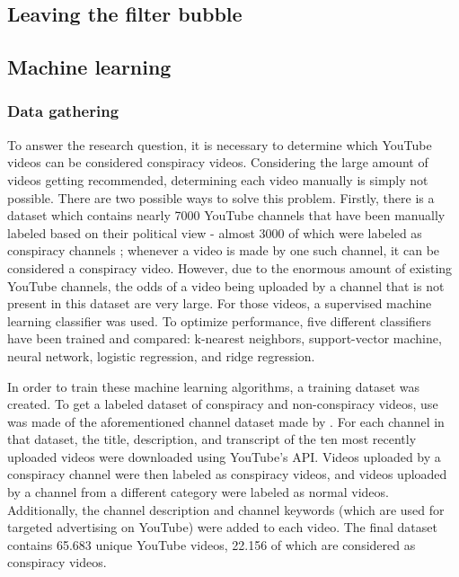 \documentclass[../main.tex]{subfiles}
\begin{document}
\linenumbers

\subsection{Leaving the filter bubble}

\subsection{Machine learning}
\subsubsection{Data gathering}
To answer the research question, it is necessary to determine which YouTube videos can be considered
conspiracy videos. Considering the large amount of videos getting recommended, determining each video
manually is simply not possible. There are two possible ways to solve this problem. Firstly, there is a
dataset which contains nearly 7000 YouTube channels that have been manually labeled based on their
political view - almost 3000 of which were labeled as conspiracy channels \citep{ledwich2019algorithmic};
whenever a video is made by one such channel, it can be considered a conspiracy video. However, due to
the enormous amount of existing YouTube channels, the odds of a video being uploaded by a channel that
is not present in this dataset are very large. For those videos, a supervised machine learning
classifier was used. To optimize performance, five different classifiers have been trained and compared:
k-nearest neighbors, support-vector machine, neural network, logistic regression, and ridge regression. 

In order to train these machine learning algorithms, a training dataset was created. To get a labeled
dataset of conspiracy and non-conspiracy videos, use was made of the aforementioned channel dataset made
by \citet{ledwich2019algorithmic}. For each channel in that dataset, the title, description, and
transcript of the ten most recently uploaded videos were downloaded using YouTube's API. Videos uploaded
by a conspiracy channel were then labeled as conspiracy videos, and videos uploaded by a channel from a
different category were labeled as normal videos. Additionally, the channel description and channel
keywords (which are used for targeted advertising on YouTube) were added to each video. The final
dataset contains 65.683 unique YouTube videos, 22.156 of which are considered as conspiracy videos. 
\end{document}
